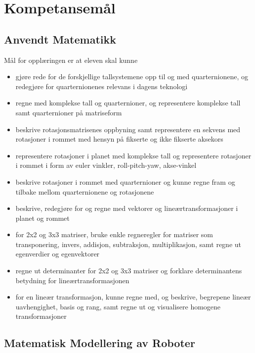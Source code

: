 \section*{Kompetansemål} \label{Sec: Kompetansemaal}

\subsection*{Anvendt Matematikk}

    Mål for opplæringen er at eleven skal kunne

    \begin{itemize}
        \item gjøre rede for de forskjellige tallsystemene opp til og med quarternionene, og redegjøre for quarternionenes relevans i dagens teknologi
        \item regne med komplekse tall og quarternioner, og representere komplekse tall samt quarternioner på matriseform
        \item beskrive rotasjonsmatrisenes oppbyning samt representere en sekvens med rotasjoner i rommet med hensyn på fikserte og ikke fikserte aksekors
        \item representere rotasjoner i planet med komplekse tall og representere rotasjoner i rommet i form av euler vinkler, roll-pitch-yaw, akse-vinkel
        \item beskrive rotasjoner i rommet med quarternioner og kunne regne fram og tilbake mellom quarternionene og rotasjonene
        \item beskrive, redegjøre for og regne med vektorer og lineærtransformasjoner i planet og rommet
        \item for 2x2 og 3x3 matriser, bruke enkle regneregler for matriser som transponering, invers, addisjon, subtraksjon, multiplikasjon, samt regne ut egenverdier og egenvektorer
        \item regne ut determinanter for 2x2 og 3x3 matriser og forklare determinantens betydning for lineærtransformasjonen
        \item for en lineær transformasjon, kunne regne med, og beskrive, begrepene lineær uavhengighet, basis og rang, samt regne ut og visualisere homogene transformasjoner
    \end{itemize}


\subsection*{Matematisk Modellering av Roboter}

